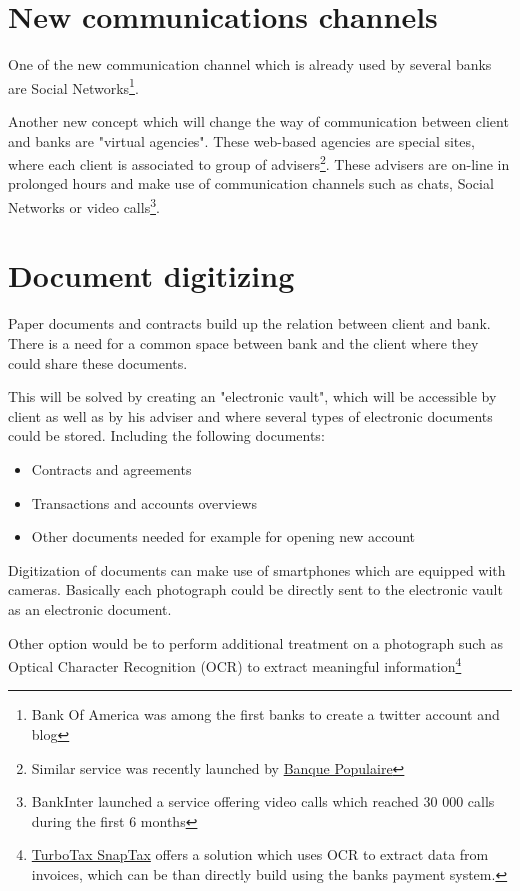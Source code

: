 \section{New communications channels}
One of the new communication channel which is already used by several banks are Social Networks\footnote{Bank Of America was among the first banks to create a twitter account and blog}.

Another new concept which will change the way of communication between client and banks are "virtual agencies". These web-based agencies are special sites, where each client is associated to group of advisers\footnote{Similar service was recently launched by \href{https://e-bp2l.net/}{Banque Populaire}}. These advisers are on-line in prolonged hours and make use of communication channels such as chats, Social Networks or video calls\footnote{BankInter launched a service offering video calls which reached 30 000 calls during the first 6 months}.

\section{Document digitizing}
Paper documents and contracts build up the relation between client and bank. There is a need for a common space between bank and the client where they could share these documents.

This will be solved by creating an "electronic vault", which will be accessible by client as well as by his adviser and where several types of electronic documents could be stored. Including the following documents:

\begin{itemize}
	\item Contracts and agreements
	\item Transactions and accounts overviews
	\item Other documents needed for example for opening new account
\end{itemize}

Digitization of documents can make use of smartphones which are equipped with cameras. Basically each photograph could be directly sent to the electronic vault as an electronic document.

Other option would be to perform additional treatment on a photograph such as Optical Character Recognition (OCR) to extract meaningful information\footnote{\href{http://turbotax.intuit.com/snaptax/mobile/}{TurboTax SnapTax} offers a solution which uses OCR to extract data from invoices, which can be than directly build using the banks payment system.}

